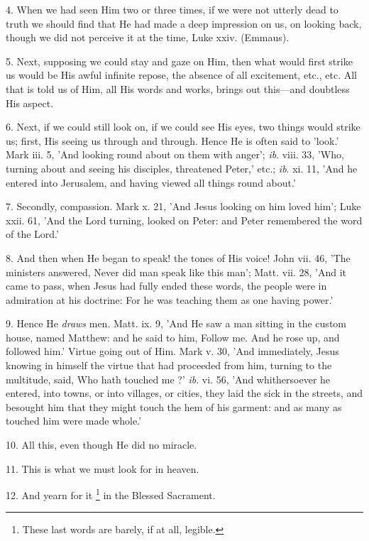 4. When we had seen Him two or three times, if we
were not utterly dead to truth we should find that He had made a deep
impression on us, on looking back, though we did not perceive it at
the time, Luke xxiv. (Emmaus).

5. Next, supposing we could stay and gaze on Him,
then what would first strike us would be His awful infinite repose,
the absence of all excitement, etc., etc. All that is told us of Him,
all His words and works, brings out this—and doubtless His aspect.

6. Next, if we could still look on, if we could
see His eyes, two things would strike us; first, His seeing us through
and through. Hence He is often said to 'look.' Mark iii. 5, 'And
looking round about on them with anger'; \emph{ib}. viii. 33, 'Who,
turning about and seeing his disciples, threatened Peter,' etc.; \emph{ib}.
xi. 11, 'And he entered into Jerusalem, and having viewed all things
round about.'

7. Secondly, compassion. Mark x. 21, 'And Jesus
looking on him loved him'; Luke xxii. 61, 'And the Lord turning,
looked on Peter: and Peter remembered the word of the Lord.'

8. And then when He began to speak! the tones of
His voice! John vii. 46, 'The ministers answered, Never did man speak
like this man'; Matt. vii. 28, 'And it came to pass, when Jesus had
fully ended these words, the people were in admiration at his
doctrine: For he was teaching them as one having power.'

9. Hence He \emph{draws} men. Matt. ix. 9, 'And
He saw a man sitting in the custom house, named Matthew: and he said
to him, Follow me. And he rose up, and followed him.' Virtue going out
of Him. Mark v. 30, 'And immediately, Jesus knowing in himself the
virtue that had proceeded from him, turning to the multitude, said,
Who hath touched me ?' \emph{ib}. vi. 56, 'And whithersoever he
entered, into towns, or into villages, or cities, they laid the sick
in the streets, and besought him that they might touch the hem of his
garment: and as many as touched him were made whole.'

10. All this, even though He did no miracle.

11. This is what we must look for in heaven.

12. And yearn for it \footnote{These last words are
barely, if at all, legible.} in the Blessed Sacrament.


